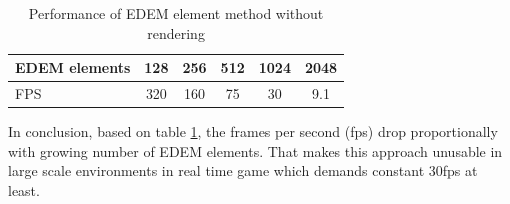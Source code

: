 \begin{table}[ht!]
    \begin{center}
  \begin{tabular}{ |l|c|c|c|c|c| } 
  \hline
  EDEM elements & 128 & 256 & 512 & 1024 & 2048 \\ 
  \hline
  FPS & 320 & 160 & 75 & 30 & 9.1 \\ 
  \hline
  
  \end{tabular}
  \end{center}
  \caption{Performance of EDEM element method without rendering \cite{edem}}
  \label{table1}
\end{table}
In conclusion, based on table \ref{table1}, the frames per second (fps) drop proportionally with growing number of EDEM elements. That makes this approach unusable in large scale environments in real time game which demands constant 30fps at least.

